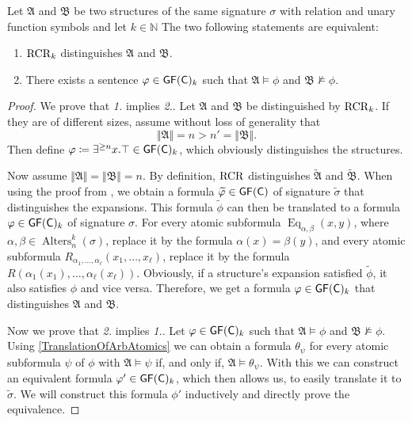 \begin{theorem}
	Let $\mathfrak A$ and $\mathfrak B$ be two structures of the same signature $\sigma$ with relation and unary function symbols and let $k\in \mathbb{N}$
	The two following statements are equivalent:
	\begin{enumerate}
		\item $\operatorname{RCR}_k$ distinguishes $\mathfrak A$ and $\mathfrak B$.
		\item There exists a sentence $\varphi\in\mathsf{GF}(\mathsf{C})_k$ such that $\mathfrak A\models \phi$ and $\mathfrak B\not\models \phi$.
	\end{enumerate}
\end{theorem}
\begin{proof}
	We prove that \emph{1.} implies \emph{2.}. 
	Let $\mathfrak A$ and $\mathfrak B$ be distinguished by $\operatorname{RCR}_k$.
	If they are of different sizes, assume without loss of generality that 
	$$\Vert \mathfrak A \Vert =n > n'=\Vert \mathfrak B \Vert.$$
	Then define $\varphi\coloneqq \exists^{\geq n} x. \top\in \mathsf{GF}(\mathsf{C})_k$, which obviously distinguishes the structures.
	
	Now assume $\Vert \mathfrak A\Vert = \Vert \mathfrak B \Vert = n$.
	By definition, $\operatorname{RCR}$ distinguishes $\widetilde{\mathfrak A}$ and $\widetilde{\mathfrak B}$.
	When using the proof from \cite{scheidt2025ColorRefinement}, we obtain a formula $\widetilde{\varphi}\in \mathsf{GF}(\mathsf{C})$ of signature $\widetilde{\sigma}$ that distinguishes the expansions.
	This formula $\widetilde{\phi}$ can then be translated to a formula $\varphi\in\mathsf{GF}(\mathsf{C})_k$ of signature $\sigma$.
	For every atomic subformula $\operatorname{Eq}_{\alpha,\beta}(x,y)$, where $\alpha,\beta\in \operatorname{Alters}_n^k(\sigma)$, replace it by the formula $\alpha(x)=\beta(y)$,
	and every atomic subformula $R_{\alpha_1,\dots,\alpha_\ell}(x_1,\dots,x_\ell)$, replace it by the formula $R(\alpha_1(x_1),\dots,\alpha_\ell(x_\ell))$.
	Obviously, if a structure's expansion satisfied $\widetilde{\phi}$, it also satisfies $\phi$ and vice versa.
	Therefore, we get a formula $\varphi\in \mathsf{GF}(\mathsf{C})_k$ that distinguishes $\mathfrak A$ and $\mathfrak B$.
	
	Now we prove that \emph{2.} implies \emph{1.}.
	Let $\varphi\in \mathsf{GF}(\mathsf{C})_k$ such that $\mathfrak A\models \phi$ and $\mathfrak B\not\models \phi$.
	Using \cref{TranslationOfArbAtomics} we can obtain a formula $\theta_\psi$ for every atomic subformula $\psi$ of $\phi$ with $\mathfrak A\models \psi$ if, and only if, $\mathfrak A\models \theta_\psi$.
	With this we can construct an equivalent formula $\varphi'\in\mathsf{GF}(\mathsf{C})_k$, which then allows us, to easily translate it to $\widetilde{\sigma}$.
	We will construct this formula $\phi'$ inductively and directly prove the equivalence.
	

\end{proof}
